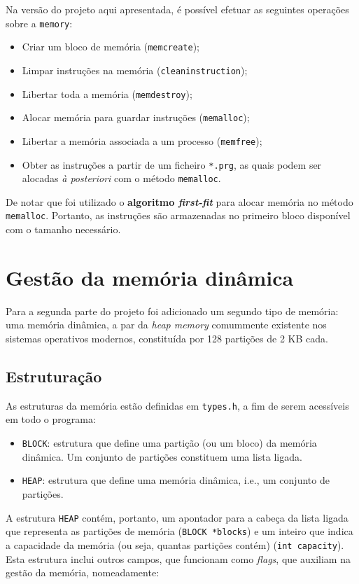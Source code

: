 \documentclass[10pt,oneside]{estiloUBI}
\begin{document}
	Na versão do projeto aqui apresentada, é possível efetuar as seguintes operações sobre a \verb|memory|:
	\begin{itemize}
		\item Criar um bloco de memória (\verb|memcreate|);
		\item Limpar instruções na memória (\verb|cleaninstruction|);
		\item Libertar toda a memória (\verb|memdestroy|);
		\item Alocar memória para guardar instruções (\verb|memalloc|);
		\item Libertar a memória associada a um processo (\verb|memfree|);
		\item Obter as instruções a partir de um ficheiro \verb|*.prg|, as quais podem ser alocadas \textit{à posteriori} com o método \verb|memalloc|.
	\end{itemize}
	
	De notar que foi utilizado o \textbf{algoritmo \textit{first-fit}} para alocar memória no método \verb|memalloc|. Portanto, as instruções são armazenadas no primeiro bloco disponível com o tamanho necessário.
	
	
	\chapter{Gestão da memória dinâmica}
	\label{sec:heap}
	
	Para a segunda parte do projeto foi adicionado um segundo tipo de memória: uma memória dinâmica, a par da \textit{heap memory} comummente existente nos sistemas operativos modernos, constituída por 128 partições de 2 KB cada.
	
	
	\section{Estruturação}
	\label{ssec:heap:struct}
	
	As estruturas da memória estão definidas em \verb|types.h|, a fim de serem acessíveis em todo o programa:
	\begin{itemize}
		\item \verb|BLOCK|: estrutura que define uma partição (ou um bloco) da memória dinâmica. Um conjunto de partições constituem uma lista ligada.
		\item \verb|HEAP|: estrutura que define uma memória dinâmica, i.e., um conjunto de partições.
	\end{itemize}

	A estrutura \verb|HEAP| contém, portanto, um apontador para a cabeça da lista ligada que representa as partições de memória (\texttt{BLOCK *blocks}) e um inteiro que indica a capacidade da memória (ou seja, quantas partições contém) (\texttt{int capacity}). Esta estrutura inclui outros campos, que funcionam como \textit{flags}, que auxiliam na gestão da memória, nomeadamente:
	
\end{document}
